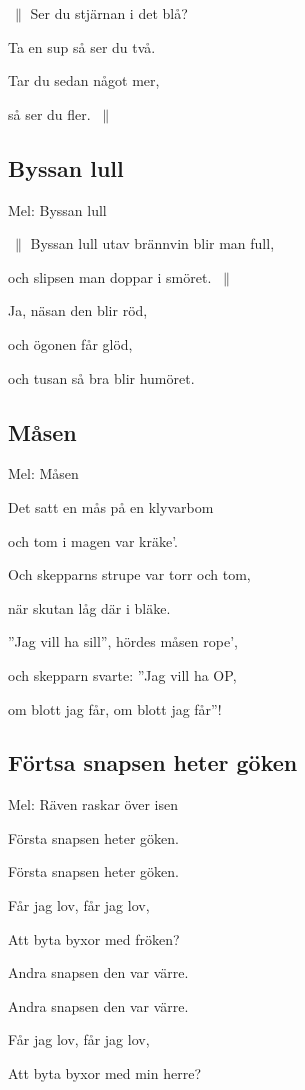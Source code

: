 $\:\|$ Ser du stjärnan i det blå?

Ta en sup så ser du två.

Tar du sedan något mer,

så ser du fler. $\:\|$\bigskip

\subsection{\textbf{Byssan lull}}

Mel: Byssan lull\bigskip

$\:\|$ Byssan lull utav brännvin blir man full,

och slipsen man doppar i smöret. $\:\|$

Ja, näsan den blir röd,

och ögonen får glöd,

och tusan så bra blir humöret.

\subsection{\textbf{Måsen}}

Mel: Måsen\bigskip


Det satt en mås på en klyvarbom

och tom i magen var kräke’.

Och skepparns strupe var torr och tom,

när skutan låg där i bläke.

”Jag vill ha sill”, hördes måsen rope’,

och skepparn svarte: ”Jag vill ha OP,

om blott jag får, om blott jag får”!

\subsection{\textbf{Förtsa snapsen heter göken}}

Mel: Räven raskar över isen\bigskip


Första snapsen heter göken.

Första snapsen heter göken.

Får jag lov, får jag lov,

Att byta byxor med fröken?

Andra snapsen den var värre.

Andra snapsen den var värre.

Får jag lov, får jag lov,

Att byta byxor med min herre?

